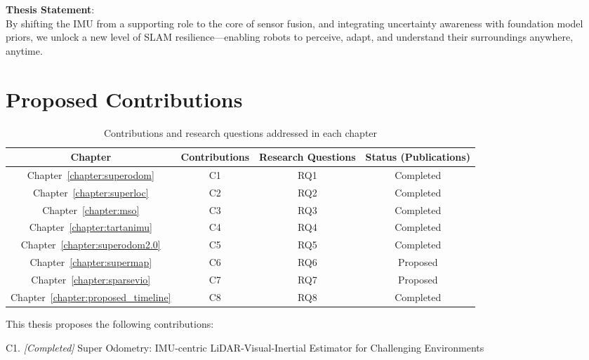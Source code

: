 \begin{framed}
\centering
\textbf{Thesis Statement}: \\ By shifting the IMU from a supporting role to the core of sensor fusion, and integrating uncertainty awareness with foundation model priors, we unlock a new level of SLAM resilience—enabling robots to perceive, adapt, and understand their surroundings anywhere, anytime.
\end{framed}




\section{Proposed Contributions}

\begin{table}[]
\centering
\begin{tabular}
{c|c|c|c}
\toprule
Chapter & Contributions & Research Questions & Status (Publications) \\
\midrule\midrule
Chapter~\ref{chapter:superodom} & C1 & RQ1 & Completed \cite{zhao2021super}\\
\midrule
Chapter~\ref{chapter:superloc} & C2 & RQ2 & Completed \cite{zhao2025superloc}\\
\midrule
Chapter~\ref{chapter:mso} & C3 & RQ3 & Completed\\
\midrule
Chapter~\ref{chapter:tartanimu} & C4 & RQ4 & Completed \\
\midrule
Chapter~\ref{chapter:superodom2.0} & C5 & RQ5 & Completed \\
\midrule
Chapter~\ref{chapter:supermap} & C6 & RQ6 & Proposed \\
\midrule
Chapter~\ref{chapter:sparsevio} & C7 & RQ7 & Proposed 
\\
\midrule
Chapter~\ref{chapter:proposed_timeline} & C8 & RQ8 & Completed
\\
\bottomrule
\end{tabular}
\caption[Contributions and research questions addressed in each chapter]{Contributions and research questions addressed in each chapter}
\label{tab:contributions-and-research-questions}
\end{table}

This thesis proposes the following contributions: 

C1. \textit{[Completed]} Super Odometry: IMU-centric LiDAR-Visual-Inertial Estimator for
Challenging Environments

